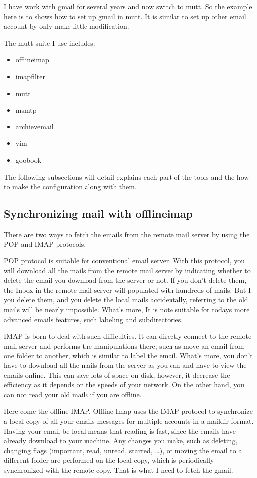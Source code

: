 \documentclass{article}
\begin{document}
I have work with gmail for several years and now switch to mutt. So the 
example here is to shows how to set up gmail in mutt. It is similar to set 
up other email account by only make little modification.

The mutt suite I use includes:
\begin{itemize}
    \item offlineimap
    \item imapfilter
    \item mutt
    \item msmtp
    \item archievemail
    \item vim
    \item goobook
\end{itemize}

The following subsections will detail explains each part of the tools and 
the how to make the configuration along with them.


\subsection{Synchronizing mail with offlineimap}
There are two ways to fetch the emails from the remote mail server by using 
the POP and IMAP protocols. 


POP protocol is suitable for conventional email server. With this protocol, 
you will download all the mails from the remote mail server by indicating 
whether to delete the email you download from the server or not. If you 
don't delete them, the Inbox in the remote mail server will populated with 
hundreds of mails. But I you delete them, and you delete the local mails 
accidentally, referring to the old mails will be nearly impossible. What's 
more, It is note suitable for todays more advanced emails features, such 
labeling and subdirectories.

IMAP is born to deal with such difficulties. It can directly connect to the 
remote mail server and performs the manipulations there, such as move an 
email from one folder to another, which is similar to label the email. 
What's more, you don't have to download all the mails from the server as 
you can and have to view the emails online. This can save lots of space on 
disk, however, it decrease the efficiency as it depends on the speeds of 
your network. On the other hand, you can not read your old mails if you are 
offline.

Here come the offline IMAP. Offline Imap uses the IMAP protocol to 
synchronize a local copy of all your emails messages for multiple accounts 
in a maildir format. Having your email be local means that reading is fast, 
since the emails have already download to your machine. Any changes you 
make, such as deleting, changing flags (important, read, unread, starred, 
\ldots), or moving the email to a different folder are performed on the 
local copy, which is periodically synchronized with the remote copy. That is 
what I need to fetch the gmail.
\end{document}
